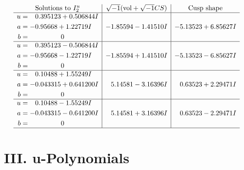 \documentclass[1p]{elsarticle_modified}
\theoremstyle{definition}
\newcommand{\I}{\sqrt{-1}}
\begin{document}
$$\begin{array}{c|c|c}  
\text{Solutions to }I^u_{2}& \I (\text{vol} + \sqrt{-1}CS) & \text{Cusp shape}\\
 \hline 
\begin{aligned}
u &= \phantom{-}0.395123 + 0.506844 I \\
a &= -0.95668 + 1.22719 I \\
b &= \phantom{-0.000000 } 0\end{aligned}
 & -1.85594 - 1.41510 I & -5.13523 + 6.85627 I \\ \hline\begin{aligned}
u &= \phantom{-}0.395123 - 0.506844 I \\
a &= -0.95668 - 1.22719 I \\
b &= \phantom{-0.000000 } 0\end{aligned}
 & -1.85594 + 1.41510 I & -5.13523 - 6.85627 I \\ \hline\begin{aligned}
u &= \phantom{-}0.10488 + 1.55249 I \\
a &= -0.043315 + 0.641200 I \\
b &= \phantom{-0.000000 } 0\end{aligned}
 & \phantom{-}5.14581 - 3.16396 I & \phantom{-}0.63523 + 2.29471 I \\ \hline\begin{aligned}
u &= \phantom{-}0.10488 - 1.55249 I \\
a &= -0.043315 - 0.641200 I \\
b &= \phantom{-0.000000 } 0\end{aligned}
 & \phantom{-}5.14581 + 3.16396 I & \phantom{-}0.63523 - 2.29471 I\\
 \hline 
 \end{array}$$\newpage
\newpage\renewcommand{\arraystretch}{1}
\centering \section*{ III. u-Polynomials}
\end{document}
